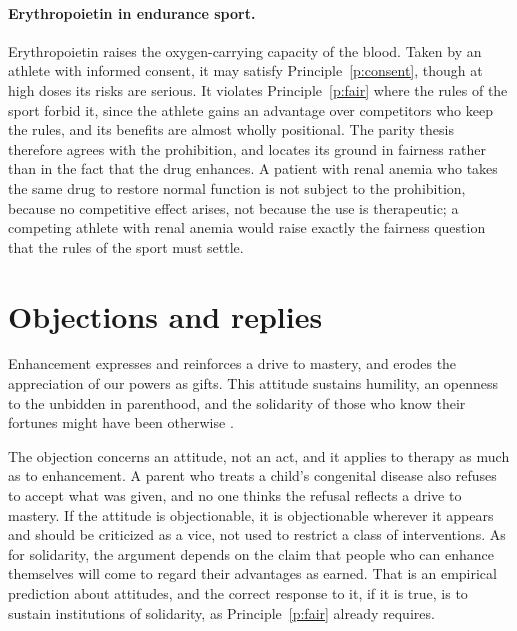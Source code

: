 \documentclass{situationist-preprint}
\begin{document}
\paragraph{Erythropoietin in endurance sport.} Erythropoietin raises the oxygen-carrying capacity of the blood. Taken by an athlete with informed consent, it may satisfy Principle~\ref{p:consent}, though at high doses its risks are serious. It violates Principle~\ref{p:fair} where the rules of the sport forbid it, since the athlete gains an advantage over competitors who keep the rules, and its benefits are almost wholly positional. The parity thesis therefore agrees with the prohibition, and locates its ground in fairness rather than in the fact that the drug enhances. A patient with renal anemia who takes the same drug to restore normal function is not subject to the prohibition, because no competitive effect arises, not because the use is therapeutic; a competing athlete with renal anemia would raise exactly the fairness question that the rules of the sport must settle.

\section{Objections and replies}

\begin{objection}[Giftedness]\label{o:sandel}
Enhancement expresses and reinforces a drive to mastery, and erodes the appreciation of our powers as gifts. This attitude sustains humility, an openness to the unbidden in parenthood, and the solidarity of those who know their fortunes might have been otherwise \citep{Sandel2007}.
\end{objection}

\begin{reply}
The objection concerns an attitude, not an act, and it applies to therapy as much as to enhancement. A parent who treats a child's congenital disease also refuses to accept what was given, and no one thinks the refusal reflects a drive to mastery. If the attitude is objectionable, it is objectionable wherever it appears and should be criticized as a vice, not used to restrict a class of interventions. As for solidarity, the argument depends on the claim that people who can enhance themselves will come to regard their advantages as earned. That is an empirical prediction about attitudes, and the correct response to it, if it is true, is to sustain institutions of solidarity, as Principle~\ref{p:fair} already requires.
\end{reply}
\end{document}
